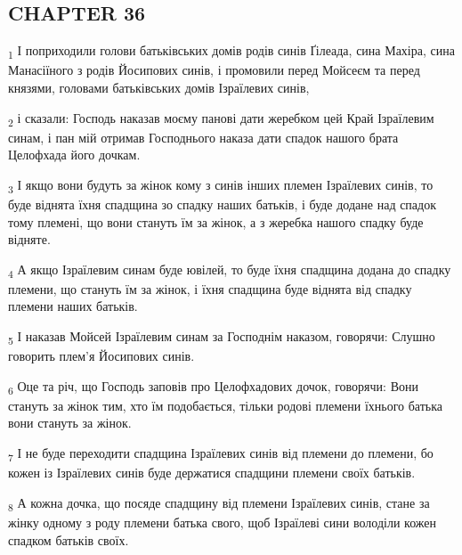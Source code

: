 \subsection{CHAPTER 36}
\begin{tcolorbox}
\textsubscript{1} І поприходили голови батьківських домів родів синів Ґілеада, сина Махіра, сина Манасіїного з родів Йосипових синів, і промовили перед Мойсеєм та перед князями, головами батьківських домів Ізраїлевих синів,
\end{tcolorbox}
\begin{tcolorbox}
\textsubscript{2} і сказали: Господь наказав моєму панові дати жеребком цей Край Ізраїлевим синам, і пан мій отримав Господнього наказа дати спадок нашого брата Целофхада його дочкам.
\end{tcolorbox}
\begin{tcolorbox}
\textsubscript{3} І якщо вони будуть за жінок кому з синів інших племен Ізраїлевих синів, то буде віднята їхня спадщина зо спадку наших батьків, і буде додане над спадок тому племені, що вони стануть їм за жінок, а з жеребка нашого спадку буде відняте.
\end{tcolorbox}
\begin{tcolorbox}
\textsubscript{4} А якщо Ізраїлевим синам буде ювілей, то буде їхня спадщина додана до спадку племени, що стануть їм за жінок, і їхня спадщина буде віднята від спадку племени наших батьків.
\end{tcolorbox}
\begin{tcolorbox}
\textsubscript{5} І наказав Мойсей Ізраїлевим синам за Господнім наказом, говорячи: Слушно говорить плем'я Йосипових синів.
\end{tcolorbox}
\begin{tcolorbox}
\textsubscript{6} Оце та річ, що Господь заповів про Целофхадових дочок, говорячи: Вони стануть за жінок тим, хто їм подобається, тільки родові племени їхнього батька вони стануть за жінок.
\end{tcolorbox}
\begin{tcolorbox}
\textsubscript{7} І не буде переходити спадщина Ізраїлевих синів від племени до племени, бо кожен із Ізраїлевих синів буде держатися спадщини племени своїх батьків.
\end{tcolorbox}
\begin{tcolorbox}
\textsubscript{8} А кожна дочка, що посяде спадщину від племени Ізраїлевих синів, стане за жінку одному з роду племени батька свого, щоб Ізраїлеві сини володіли кожен спадком батьків своїх.
\end{tcolorbox}
